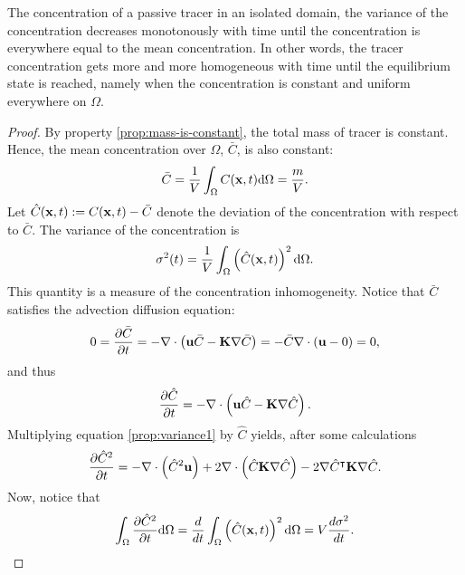 \begin{property}
	The concentration of a passive tracer in an isolated domain, the variance of the concentration decreases monotonously with time until the concentration is everywhere equal to the mean concentration. In other words, the tracer concentration gets more and more homogeneous with time until the equilibrium state is reached, namely when the concentration is constant and uniform everywhere on $\Omega$.
\end{property}
\begin{proof}
	By property \ref{prop:mass-is-constant}, the total mass of tracer is constant. Hence, the mean concentration over $\Omega$, $\bar C$, is also constant:
	\begin{equation}
	 	\bar C = \frac{1}{V} \int_{\Omega} C(\mathbf x,t) \mathrm d\Omega = \frac{m}{V}.
	 \end{equation} 
	 Let $\hat C(\mathbf x,t) := C(\mathbf x,t) - \bar C$ denote the deviation of the concentration with respect to $\bar C$. The variance of the concentration is
	 \begin{equation}
	 	\sigma^2(t) = \frac{1}{V} \int_{\Omega} \left(\hat C(\mathbf x,t)\right)^2 \mathrm d\Omega.
	 \end{equation}
	 This quantity is a measure of the concentration inhomogeneity. Notice that $\bar C$ satisfies the advection diffusion equation:
	 \begin{equation}
	 	0 = \frac{\partial \bar C}{\partial t} = -\nabla \cdot \left(\mathbf u \bar C - \mathbf K \nabla \bar C\right) = - \bar C \nabla \cdot (\mathbf u - 0) = 0,
	 \end{equation}
	 and thus
	 \begin{equation} \label{prop:variance1}
	 	\frac{\partial \hat C}{\partial t} = -\nabla \cdot \left(\mathbf u \hat C - \mathbf K \nabla \hat C\right).
	 \end{equation}
	 Multiplying equation \eqref{prop:variance1} by $\hat C$ yields, after some calculations
	 \begin{equation} \label{prop:variance2}
	 	\frac{\partial \hat C^2}{\partial t} = - \nabla \cdot \left(\hat C^2 \mathbf u \right) + 2\nabla \cdot \left(\hat C \mathbf K \nabla \hat C \right) - 2 \nabla \hat C^\intercal \mathbf K \nabla \hat C.
	 \end{equation}
	 Now, notice that
	 \begin{equation} \label{prop:variance3}
	 	\int_{\Omega} \frac{\partial \hat C^2}{\partial t} \mathrm d\Omega = \frac{d}{dt} \int_{\Omega} \left( \hat C(\mathbf x,t) \right)^2 \mathrm d\Omega = V\frac{d\sigma^2}{dt}.
	 \end{equation}

\end{proof}
